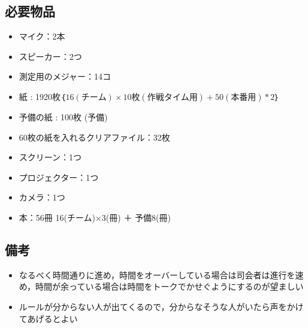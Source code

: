 \documentclass[a4j,titlepage]{jarticle}
\begin{document}
\subsection{必要物品}
\begin{itemize}
\item マイク：2本
\item スピーカー：2つ
\item 測定用のメジャー：14コ
\item 紙 : 1920枚$｛16(チーム)×{10枚(作戦タイム用)+50(本番用)}*2｝$
\item 予備の紙 : 100枚 (予備)
\item 60枚の紙を入れるクリアファイル：32枚
\item スクリーン：1つ
\item プロジェクター：1つ
\item カメラ：1つ
\item 本：56冊 {16(チーム)×3(冊) ＋ 予備8(冊)}
\end{itemize}


\subsection{備考}
\begin{itemize}
\item なるべく時間通りに進め，時間をオーバーしている場合は司会者は進行を速め，時間が余っている場合は時間をトークでかせぐようにするのが望ましい
\item ルールが分からない人が出てくるので，分からなそうな人がいたら声をかけてあげるとよい
\end{itemize}

%


\end{document}
